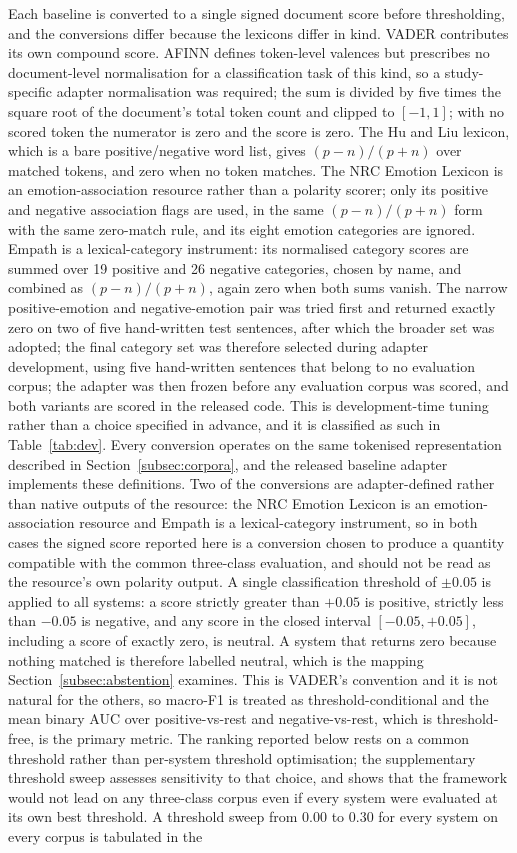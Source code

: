 \documentclass[fleqn,10pt]{wlscirep}
\begin{document}
Each baseline is converted to a single signed document score before thresholding, and the conversions differ because the lexicons differ in kind. VADER contributes its own compound score. AFINN defines token-level valences but prescribes no document-level normalisation for a classification task of this kind, so a study-specific adapter normalisation was required; the sum is divided by five times the square root of the document's total token count and clipped to $[-1,1]$; with no scored token the numerator is zero and the score is zero. The Hu and Liu lexicon, which is a bare positive/negative word list, gives $(p-n)/(p+n)$ over matched tokens, and zero when no token matches. The NRC Emotion Lexicon is an emotion-association resource rather than a polarity scorer; only its positive and negative association flags are used, in the same $(p-n)/(p+n)$ form with the same zero-match rule, and its eight emotion categories are ignored. Empath is a lexical-category instrument: its normalised category scores are summed over 19 positive and 26 negative categories, chosen by name, and combined as $(p-n)/(p+n)$, again zero when both sums vanish. The narrow positive-emotion and negative-emotion pair was tried first and returned exactly zero on two of five hand-written test sentences, after which the broader set was adopted; the final category set was therefore selected during adapter development, using five hand-written sentences that belong to no evaluation corpus; the adapter was then frozen before any evaluation corpus was scored, and both variants are scored in the released code. This is development-time tuning rather than a choice specified in advance, and it is classified as such in Table~\ref{tab:dev}. Every conversion operates on the same tokenised representation described in Section~\ref{subsec:corpora}, and the released baseline adapter implements these definitions. Two of the conversions are adapter-defined rather than native outputs of the resource: the NRC Emotion Lexicon is an emotion-association resource and Empath is a lexical-category instrument, so in both cases the signed score reported here is a conversion chosen to produce a quantity compatible with the common three-class evaluation, and should not be read as the resource's own polarity output. A single classification threshold of $\pm 0.05$ is applied to all systems: a score strictly greater than $+0.05$ is positive, strictly less than $-0.05$ is negative, and any score in the closed interval $[-0.05, +0.05]$, including a score of exactly zero, is neutral. A system that returns zero because nothing matched is therefore labelled neutral, which is the mapping Section~\ref{subsec:abstention} examines. This is VADER's convention and it is not natural for the others, so macro-F1 is treated as threshold-conditional and the mean binary AUC over positive-vs-rest and negative-vs-rest, which is threshold-free, is the primary metric. The ranking reported below rests on a common threshold rather than per-system threshold optimisation; the supplementary threshold sweep assesses sensitivity to that choice, and shows that the framework would not lead on any three-class corpus even if every system were evaluated at its own best threshold. A threshold sweep from 0.00 to 0.30 for every system on every corpus is tabulated in the 
\end{document}
